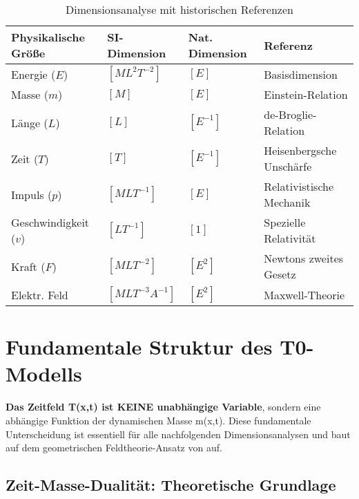 \documentclass[12pt,a4paper]{article}
\begin{document}
	\begin{table}[htbp]
		\footnotesize
		\centering
		\begin{tabular}{p{3cm}p{2.5cm}p{2cm}p{7cm}}
			\toprule
			\textbf{Physikalische Größe} & \textbf{SI-Dimension} & \textbf{Nat. Dimension} & \textbf{Referenz} \\
			\midrule
			Energie ($E$) & $[ML^2T^{-2}]$ & $[E]$ & Basisdimension \citep{weinberg1995} \\
			Masse ($m$) & $[M]$ & $[E]$ & Einstein-Relation \citep{einstein1905} \\
			Länge ($L$) & $[L]$ & $[E^{-1}]$ & de-Broglie-Relation \citep{debroglie1924} \\
			Zeit ($T$) & $[T]$ & $[E^{-1}]$ & Heisenbergsche Unschärfe \citep{heisenberg1927} \\
			Impuls ($p$) & $[MLT^{-1}]$ & $[E]$ & Relativistische Mechanik \citep{weinberg1995} \\
			Geschwindigkeit ($v$) & $[LT^{-1}]$ & $[1]$ & Spezielle Relativität \citep{einstein1905} \\
			Kraft ($F$) & $[MLT^{-2}]$ & $[E^2]$ & Newtons zweites Gesetz \\
			Elektr. Feld & $[MLT^{-3}A^{-1}]$ & $[E^2]$ & Maxwell-Theorie \citep{jackson1998} \\
			\bottomrule
		\end{tabular}
		\caption{Dimensionsanalyse mit historischen Referenzen}
		\label{tab:dimensions_with_refs}
	\end{table}
	
	\section{Fundamentale Struktur des T0-Modells}
	\label{sec:fundamental_structure}
	
	\begin{tcolorbox}[colback=red!5!white,colframe=red!75!black,title=Kritischer Hinweis zur mathematischen Struktur]
		\textbf{Das Zeitfeld T(x,t) ist KEINE unabhängige Variable}, sondern eine abhängige Funktion der dynamischen Masse m(x,t). Diese fundamentale Unterscheidung ist essentiell für alle nachfolgenden Dimensionsanalysen und baut auf dem geometrischen Feldtheorie-Ansatz von \citet{misner1973} auf.
	\end{tcolorbox}
	
	\subsection{Zeit-Masse-Dualität: Theoretische Grundlage}
	\label{subsec:time_mass_duality}
	
\end{document}
